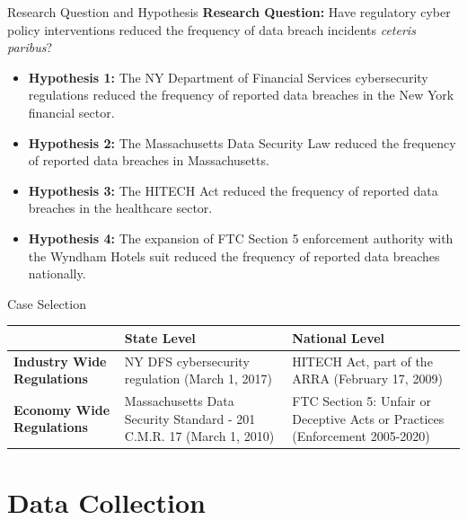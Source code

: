 \documentclass[10pt]{beamer}
\begin{document}
\begin{frame}{Research Question and Hypothesis}
\textbf{Research Question:} Have regulatory cyber policy interventions reduced the frequency of data breach incidents \textit{ceteris paribus}? \\
\begin{itemize}[<+- | alert@+>]
\item \textbf{Hypothesis 1:} The NY Department of Financial Services cybersecurity regulations reduced the frequency of reported data breaches in the New York financial sector.
\item \textbf{Hypothesis 2:} The Massachusetts Data Security Law reduced the frequency of reported data breaches in Massachusetts. \\
\item \textbf{Hypothesis 3:} The HITECH Act reduced the frequency of reported data breaches in the healthcare sector. \\
\item \textbf{Hypothesis 4:} The expansion of FTC Section 5 enforcement authority with the Wyndham Hotels suit reduced the frequency of reported data breaches nationally.

\end{itemize}
\end{frame}


\begin{frame}{Case Selection}
\begin{table}[h!]
    \begin{center}
    \label{tab:table1}
    \begin{tabular}{|p{2.5cm}|p{3.5cm}|p{3.5cm}|}
        \hline
        & \textbf{State Level} & \textbf{National Level} \\ \hline
      \textbf{Industry Wide Regulations} & NY DFS cybersecurity regulation (March 1, 2017) & HITECH Act, part of the ARRA (February 17, 2009) \\ \hline
      \textbf{Economy Wide Regulations} & Massachusetts Data Security Standard - 201 C.M.R. 17 (March 1, 2010) & FTC Section 5: Unfair or Deceptive Acts or Practices (Enforcement 2005-2020) \\
      \hline
    \end{tabular}
  \end{center}
\end{table}
\end{frame}


\section{Data Collection}
\end{document}
